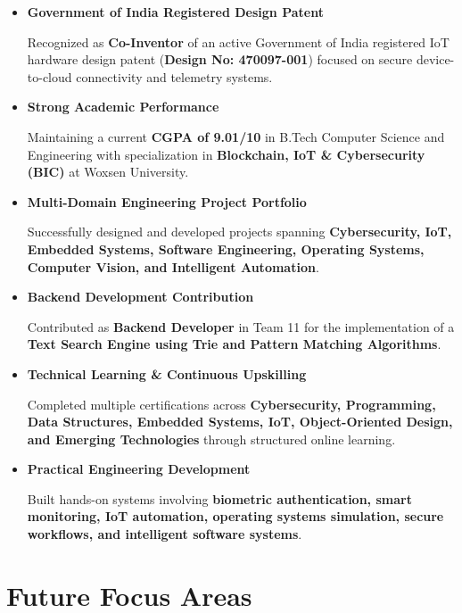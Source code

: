 \documentclass[a4paper,11pt]{article}
\begin{document}
\begin{itemize}

    \item \textbf{Government of India Registered Design Patent}
    
    Recognized as \textbf{Co-Inventor} of an active Government of India registered IoT hardware design patent (\textbf{Design No: 470097-001}) focused on secure device-to-cloud connectivity and telemetry systems.

    \item \textbf{Strong Academic Performance}
    
    Maintaining a current \textbf{CGPA of 9.01/10} in B.Tech Computer Science and Engineering with specialization in \textbf{Blockchain, IoT \& Cybersecurity (BIC)} at Woxsen University.

    \item \textbf{Multi-Domain Engineering Project Portfolio}
    
    Successfully designed and developed projects spanning \textbf{Cybersecurity, IoT, Embedded Systems, Software Engineering, Operating Systems, Computer Vision, and Intelligent Automation}.

    \item \textbf{Backend Development Contribution}
    
    Contributed as \textbf{Backend Developer} in Team 11 for the implementation of a \textbf{Text Search Engine using Trie and Pattern Matching Algorithms}.

    \item \textbf{Technical Learning \& Continuous Upskilling}
    
    Completed multiple certifications across \textbf{Cybersecurity, Programming, Data Structures, Embedded Systems, IoT, Object-Oriented Design, and Emerging Technologies} through structured online learning.

    \item \textbf{Practical Engineering Development}
    
    Built hands-on systems involving \textbf{biometric authentication, smart monitoring, IoT automation, operating systems simulation, secure workflows, and intelligent software systems}.

\end{itemize}




\section{Future Focus Areas}
\end{document}
